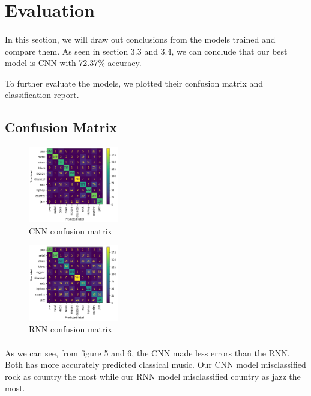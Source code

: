 \section{Evaluation}
    \paragraph{}
    In this section, we will draw out conclusions from the models trained and compare them. As seen in section 3.3 and 3.4, we can conclude that our best model is CNN with 72.37\% accuracy.
    
    To further evaluate the models, we plotted their confusion matrix and classification report.
    
    \subsection{Confusion Matrix}
    \begin{figure}[H]
        \centering
        \includegraphics[width=0.35\textwidth]{images/cnn_matrix.png} 
        \caption{CNN confusion matrix}
    \end{figure}

    \begin{figure}[H]
        \centering
        \includegraphics[width=0.35\textwidth]{images/rnn_matrix.png} 
        \caption{RNN confusion matrix}
    \end{figure}  
    
    \paragraph{}
    As we can see, from figure 5 and 6, the CNN made less errors than the RNN. Both has more accurately predicted classical music. Our CNN model misclassified rock as country the most while our RNN model misclassified country as jazz the most.
    
